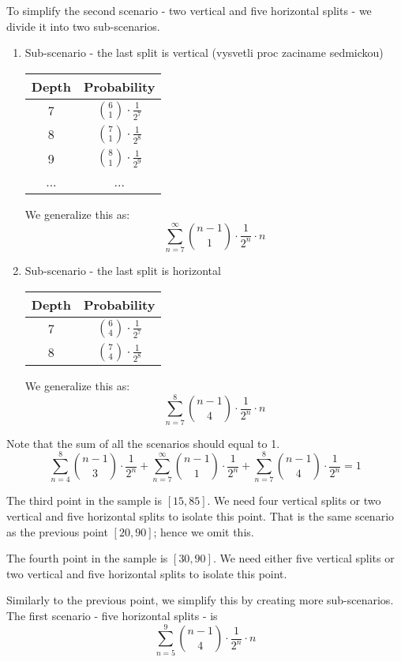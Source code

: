 To simplify the second scenario - two vertical and five horizontal splits - we divide it into two sub-scenarios.
\begin{enumerate}
    \item Sub-scenario - the last split is vertical (vysvetli proc zaciname sedmickou)

\begin{center}
\begin{tabular}{||c c||} 
 \hline
 Depth & Probability \\ [1ex] 
 \hline
 7 & $\binom{6}{1}\cdot \frac{1}{2^7}$\\ 
 \hline
 8 & $\binom{7}{1}\cdot \frac{1}{2^8}$  \\
 \hline
 9 & $\binom{8}{1}\cdot \frac{1}{2^9}$  \\
 \hline
 ... & ... \\ [1ex] 
 \hline
\end{tabular}
\end{center}
We generalize this as:
$$\sum_{n=7}^{\infty}\binom{n-1}{1}\cdot \frac{1}{2^n}\cdot n$$
\item Sub-scenario - the last split is horizontal
\begin{center}
\begin{tabular}{||c c||} 
 \hline
 Depth & Probability \\ [1ex] 
 \hline
 7 & $\binom{6}{4}\cdot \frac{1}{2^7}$\\ 
 \hline
 8 & $\binom{7}{4}\cdot \frac{1}{2^8}$  \\[1ex] 
 \hline
\end{tabular}
\end{center}
We generalize this as: 
$$\sum_{n=7}^{8}\binom{n-1}{4}\cdot \frac{1}{2^n}\cdot n$$
\end{enumerate}

Note that the sum of all the scenarios should equal to 1.
$$\sum_{n=4}^{8}\binom{n-1}{3}\cdot \frac{1}{2^n} +
\sum_{n=7}^{\infty}\binom{n-1}{1}\cdot \frac{1}{2^n} +
\sum_{n=7}^{8}\binom{n-1}{4}\cdot \frac{1}{2^n} = 1
$$

The third point in the sample is $[15,85]$. We need four vertical splits or two vertical and five horizontal splits to isolate this point. That is the same scenario as the previous point $[20,90]$; hence we omit this.

The fourth point in the sample is $[30,90]$. We need either five vertical splits or two vertical and five horizontal splits to isolate this point.

Similarly to the previous point, we simplify this by creating more sub-scenarios.
The first scenario - five horizontal splits - is 
$$\sum_{n=5}^{9}\binom{n-1}{4}\cdot \frac{1}{2^n}\cdot n$$

